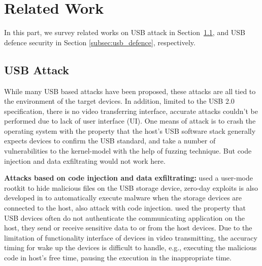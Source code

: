 \section{Related Work}
\label{sec:related_work}

In this part, we survey related works on USB attack in Section~\ref{subsec:usb_attack}, and USB defence security in Section \ref{subsec:usb_defence}, respectively.

\subsection{USB Attack}
\label{subsec:usb_attack}
While many USB based attacks have been proposed, these attacks are all tied to the environment of the target devices. In addition, limited to the USB 2.0\cite{usb20} specification, there is no video transferring interface, accurate attacks couldn't be performed due to lack of user interface (UI). One means of attack is to crash the operating system with the property that the host's USB software stack generally expects devices to confirm the USB standard, \cite{facedancer} and \cite{syzkaller} take a number of vulnerabilities to the kernel-model with the help of fuzzing technique. But code injection and data exfiltrating would not work here. 

\textbf{Attacks based on code injection and data exfiltrating: } \cite{duqu} used a user-mode rootkit to hide malicious files on the USB storage device, zero-day exploits is also developed in \cite{zero-day} to automatically execute malware when the storage devices are connected to the host, \cite{brain, stuxnet, conficker,flame} also attack with code injection. \cite{webcam, malware, audioextraction, usbee, turnip} used the property that USB devices often do not authenticate the communicating application on the host, they send or receive sensitive data to or from the host devices. Due to the limitation of functionality interface of devices in video transmitting, the accuracy timing for wake up the devices is difficult to handle, e.g., executing the malicious code in host's free time, pausing the execution in the inappropriate time. 


